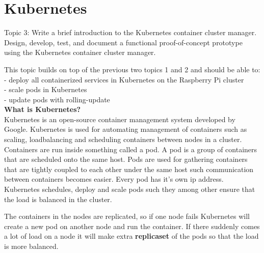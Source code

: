 \chapter{Kubernetes}\label{ch:kubernetes}
Topic 3: Write a brief introduction to the Kubernetes container cluster manager. 
Design, develop, test, and document a functional proof-of-concept prototype using the Kubernetes container cluster manager. 

This topic builds on top of the previous two topics 1 and 2 and should be able to:\\
- deploy all containerized services in Kubernetes on the Raspberry Pi cluster \\
- scale pods in Kubernetes \\
- update pods with rolling-update \\

\textbf{What is Kubernetes?}\\
Kubernetes is an open-source container management system developed by Google.
Kubernetes is used for automating management of containers such as scaling, loadbalancing and scheduling containers between nodes in a cluster. Containers are run inside something called a pod.
A pod is a group of containers that are scheduled onto the same host.
Pods are used for gathering containers that are tightly coupled to each other under the same host such communication between containers becomes easier. Every pod has it's own ip address. Kubernetes schedules, deploy and scale pods such they among other ensure that the load is balanced in the cluster. 

The containers in the nodes are replicated, so if one node fails Kubernetes will create a new pod on another node and run the container. 
If there suddenly comes a lot of load on a node it will make extra \textbf{replicaset} of the pods so that the load is more balanced. 
